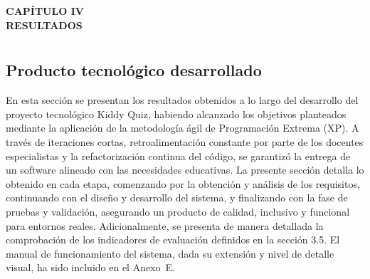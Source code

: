 
\cleardoublepage
\thispagestyle{empty}
\vspace*{\fill}
\begin{center}
{\Large\bfseries CAPÍTULO IV}\\[2.5cm]
{\Large\bfseries RESULTADOS}
\end{center}
\vspace*{\fill}
\clearpage

\chapter*{}
\setcounter{chapter}{4}
\setcounter{section}{0}
\renewcommand{\thesection}{4.\arabic{section}}
\renewcommand{\thesubsection}{4.\arabic{section}.\arabic{subsection}}

\vspace{-3cm}

\section{Producto tecnológico desarrollado}

En esta sección se presentan los resultados obtenidos a lo largo del desarrollo del proyecto tecnológico Kiddy Quiz, habiendo alcanzado los objetivos planteados mediante la aplicación de la metodología ágil de Programación Extrema (XP). A través de iteraciones cortas, retroalimentación constante por parte de los docentes especialistas y la refactorización continua del código, se garantizó la entrega de un software alineado con las necesidades educativas. La presente sección detalla lo obtenido en cada etapa, comenzando por la obtención y análisis de los requisitos, continuando con el diseño y desarrollo del sistema, y finalizando con la fase de pruebas y validación, asegurando un producto de calidad, inclusivo y funcional para entornos reales. Adicionalmente, se presenta de manera detallada la comprobación de los indicadores de evaluación definidos en la sección 3.5. El manual de funcionamiento del sistema, dada su extensión y nivel de detalle visual, ha sido incluido en el Anexo~E.

